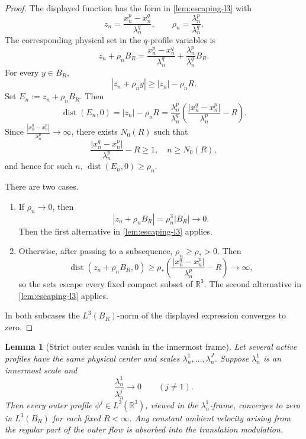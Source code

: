\documentclass[11pt]{amsart}
\theoremstyle{plain}
\newtheorem{lemma}[theorem]{Lemma}
\theoremstyle{definition}
\theoremstyle{remark}
\begin{document}
\begin{proof}
The displayed function has the form in \cref{lem:escaping-l3} with
\[
  z_n=\frac{x^p_n-x^q_n}{\lambda^q_n},
  \qquad
  \rho_n=\frac{\lambda^p_n}{\lambda^q_n}.
\]
The corresponding physical set in the \(q\)-profile variables is
\[
  z_n+\rho_nB_R
  =\frac{x^p_n-x^q_n}{\lambda^q_n}
   +\frac{\lambda^p_n}{\lambda^q_n}B_R.
\]
For every \(y\in B_R\),
\[
  |z_n+\rho_n y|
  \ge |z_n|-\rho_nR.
\]
Set \(E_n:=z_n+\rho_nB_R\).  Then
\[
  \operatorname{dist}(E_n,0)
  =|z_n|-\rho_nR
  =\frac{\lambda^p_n}{\lambda^q_n}\left(\frac{|x^q_n-x^p_n|}{\lambda^p_n}-R\right).
\]
Since \(\frac{|x^q_n-x^p_n|}{\lambda^p_n}\to\infty\), there exists \(N_0(R)\) such that
\[
  \frac{|x^q_n-x^p_n|}{\lambda^p_n}-R\ge1,\quad n\ge N_0(R),
\]
and hence for such \(n\), \(\operatorname{dist}(E_n,0)\ge\rho_n\).
\par
There are two cases.
\begin{enumerate}[label=\textup{(\alph*)}]
\item If \(\rho_n\to0\), then
 \[
   |z_n+\rho_nB_R|=\rho_n^3|B_R|\to0.
 \]
 Then the first alternative in \cref{lem:escaping-l3} applies.
\item Otherwise, after passing to a subsequence, \(\rho_n\ge\rho_\ast>0\).  Then
 \[
   \operatorname{dist}(z_n+\rho_nB_R,0)\ge \rho_\ast\left(\frac{|x^q_n-x^p_n|}{\lambda^p_n}-R\right)\to\infty,
 \]
 so the sets escape every fixed compact subset of \(\mathbb R^3\).  The
 second alternative in \cref{lem:escaping-l3} applies.
\end{enumerate}
In both subcases the \(L^3(B_R)\)-norm of the displayed expression converges to
zero.
\end{proof}

\begin{lemma}[Strict outer scales vanish in the innermost frame]\label{lem:outer-vanish}
Let several active profiles have the same physical center and scales
\(\lambda^1_n,\ldots,\lambda^J_n\).  Suppose \(\lambda^1_n\) is an innermost
scale and
\[
  \frac{\lambda^1_n}{\lambda^j_n}\to0
  \qquad (j\ne1).
\]
Then every outer profile \(\phi^j\in L^3(\mathbb R^3)\), viewed in the
\(\lambda^1_n\)-frame, converges to zero in \(L^3(B_R)\) for each fixed
\(R<\infty\).  Any constant ambient velocity arising from the regular part of
the outer flow is absorbed into the translation modulation.
\end{lemma}
\end{document}
